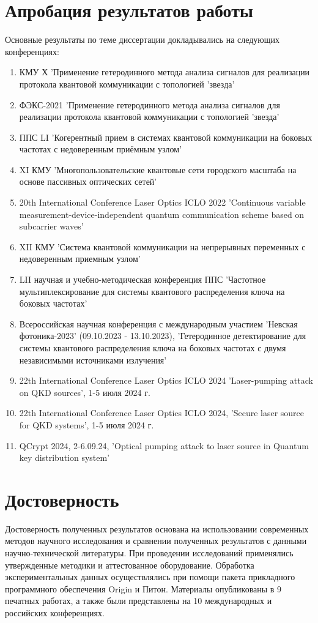 \section*{Апробация результатов работы}
Основные результаты по теме диссертации докладывались на следующих конференциях:
\begin{enumerate}
    \item КМУ Х 'Применение гетеродинного метода анализа сигналов для реализации протокола квантовой коммуникации с топологией 'звезда'
    \item ФЭКС-2021 'Применение гетеродинного метода анализа сигналов для реализации протокола квантовой коммуникации с топологией 'звезда'
    \item ППС LI 'Когерентный прием в системах квантовой коммуникации на боковых частотах с недоверенным приёмным узлом'
    \item XI КМУ 'Многопользовательские квантовые сети городского масштаба на основе пассивных оптических сетей'
    \item 20th International Conference Laser Optics ICLO 2022 'Continuous variable measurement-device-independent quantum communication scheme based on subcarrier waves'
    \item XII КМУ 'Система квантовой коммуникации на непрерывных переменных с недоверенным приемным узлом'
    \item LII научная и учебно-методическая конференция ППС 'Частотное мультиплексирование для системы квантового распределения ключа на боковых частотах'
    \item Всероссийская научная конференция с международным участием 'Невская фотоника-2023' (09.10.2023 - 13.10.2023), 'Гетеродинное детектирование для системы квантового распределения ключа на боковых частотах с двумя независимыми источниками излучения'
    \item 22th International Conference Laser Optics ICLO 2024 'Laser-pumping attack on QKD sources', 1-5 июля 2024 г.
    \item 22th International Conference Laser Optics ICLO 2024, 'Secure laser source for QKD systems', 1-5 июля 2024 г.
    \item QCrypt 2024, 2-6.09.24, 'Optical pumping attack to laser source in Quantum key distribution system'
\end{enumerate}



\section*{Достоверность}
Достоверность полученных результатов основана на использовании современных методов научного исследования и сравнении полученных результатов с данными научно-технической литературы. При проведении исследований применялись утвержденные методики и аттестованное оборудование. Обработка экспериментальных данных осуществлялись при помощи пакета прикладного программного обеспечения Origin и Питон. Материалы опубликованы в 9 печатных работах, а также были представлены на 10 международных и российских конференциях.
